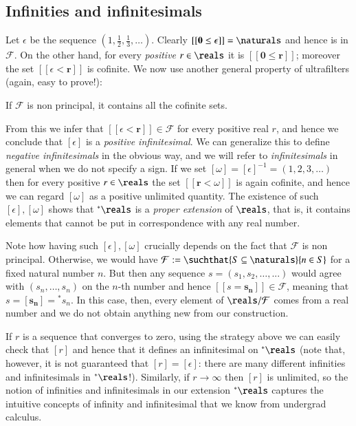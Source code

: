 \documentclass[adraft, copyright,creativecommons,sharealike,noncommercial]{eptcs}
\newcommand{\nstar}{{^*}}
\begin{document}
\subsection{Infinities and infinitesimals}
Let $\epsilon$ be the sequence $(1, \frac{1}{2}, \frac{1}{3}, \dots)$.
Clearly $[[\mathbf{0} \leq \epsilon]] = \naturals$ and hence is in $\mathcal{F}$. On the other hand, for every \emph{positive} $r \in \reals$ it is $[[\mathbf{0} \leq \mathbf{r}]]$; moreover the set $[[\epsilon < \mathbf{r}]]$ is cofinite. We now use another general property of ultrafilters (again, easy to prove!):
\begin{center}
	If $\mathcal{F}$ is non principal, it contains all the cofinite sets.
\end{center}
From this we infer that $[[\epsilon < \mathbf{r}]] \in \mathcal{F}$ for every positive real $r$, and hence we conclude that $[\epsilon]$ is a \emph{positive infinitesimal}. We can generalize this to define \emph{negative infinitesimals} in the obvious way, and we will refer to \emph{infinitesimals} in general when we do not specify a sign. If we set $[\omega] = [\epsilon]^{-1} = (1,2,3,\dots)$ then for every positive $r \in \reals$ the set $[[\mathbf{r} < \omega]]$ is again cofinite, and hence we can regard $[\omega]$ as a positive unlimited quantity. The existence of such $[\epsilon], [\omega]$ shows that $\nstar \reals$ is a \emph{proper extension} of $\reals$, that is, it contains elements that cannot be put in correspondence with any real number.
\begin{remark}
	Note how having such $[\epsilon], [\omega]$ crucially depends on the fact that $\mathcal{F}$ is non principal. Otherwise, we would have $\mathcal{F}:= \suchthat{S \subseteq \naturals}{n \in S}$ for a fixed natural number $n$. But then any sequence $s = (s_1, s_2, \dots, ...)$ would agree with $(s_n, \dots, s_n)$ on the $n$-th number and hence $[[s = \mathbf{s_n}]] \in \mathcal{F}$, meaning that $s = [\mathbf{s_n}] = \nstar s_n$. In this case, then, every element of $\reals/\mathcal{F}$ comes from a real number and we do not obtain anything new from our construction.
\end{remark}
%
If $r$ is a sequence that converges to zero, using the strategy above we can easily check that $[r]$ and hence that it defines an infinitesimal on $\nstar \reals$ (note that, however, it is not guaranteed that $[r] = [\epsilon]$: there are many different infinities and infinitesimals in $\nstar \reals$!). Similarly, if $r \to \infty$ then $[r]$ is unlimited, so the notion of infinities and infinitesimals in our extension $\nstar \reals$ captures the intuitive concepts of infinity and infinitesimal that we know from undergrad calculus. 
\end{document}
